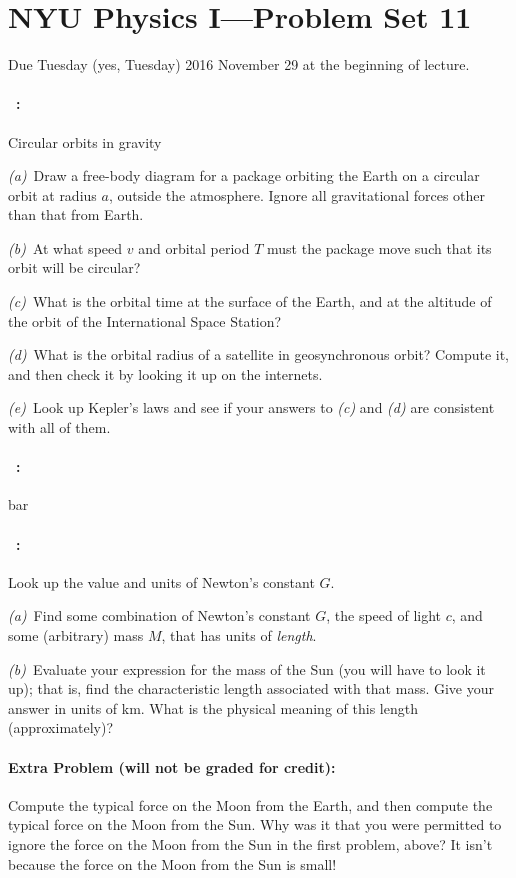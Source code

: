 \documentclass[12pt]{article}
\begin{document}
\section*{NYU Physics I---Problem Set 11}

Due Tuesday (yes, Tuesday) 2016 November 29 at the beginning of lecture.

\paragraph{\problemname~\theproblem:}%
Circular orbits in gravity

\textsl{(a)}~Draw a free-body diagram for a package orbiting the Earth
on a circular orbit at radius $a$, outside the atmosphere. Ignore all
gravitational forces other than that from Earth.

\textsl{(b)}~At what speed $v$ and orbital period $T$ must the package
move such that its orbit will be circular?

\textsl{(c)}~What is the orbital time at the surface of the Earth, and
at the altitude of the orbit of the International Space Station?

\textsl{(d)}~What is the orbital radius of a satellite in geosynchronous
orbit? Compute it, and then check it by looking it up on the internets.

\textsl{(e)}~Look up Kepler's laws and see if your answers to
\textsl{(c)} and \textsl{(d)} are consistent with all of them.

\paragraph{\problemname~\theproblem:}%
bar

\paragraph{\problemname~\theproblem:}%
Look up the value and units of Newton's constant $G$.

\textsl{(a)}~Find some combination of Newton's constant $G$, the speed of light $c$, and
some (arbitrary) mass $M$, that has units of \emph{length}.

\textsl{(b)}~Evaluate your expression for the mass of the Sun (you
will have to look it up); that is, find the characteristic length
associated with that mass.  Give your answer in units of km.  What is
the physical meaning of this length (approximately)?

\paragraph{Extra Problem (will not be graded for credit):}%
Compute the typical force on the Moon from the Earth, and then compute
the typical force on the Moon from the Sun. Why was it that you were
permitted to ignore the force on the Moon from the Sun in the first
problem, above? It isn't because the force on the Moon from the Sun is
small!
\end{document}
